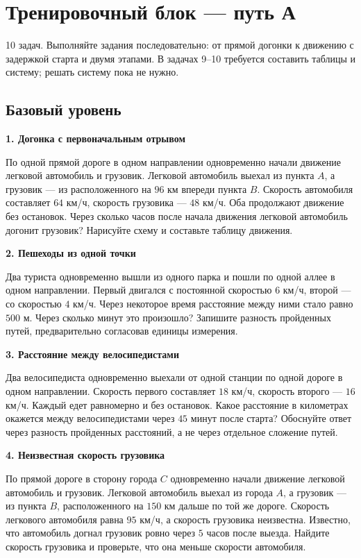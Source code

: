 \documentclass[a4paper,12pt]{article}
\newcommand{\task}[2]{\Needspace{9\baselineskip}\par\noindent\textbf{\textcolor{darkaccent}{#1.} #2}\par}
\newcommand{\smallnote}[1]{{\small\color{muted}#1}}
\begin{document}
\clearpage
\section*{Тренировочный блок --- путь А}
\smallnote{10 задач. Выполняйте задания последовательно: от прямой догонки к движению с задержкой старта и двумя этапами. В задачах 9--10 требуется составить таблицы и систему; решать систему пока не нужно.}
\vspace{3mm}

\subsection*{Базовый уровень}
\task{1}{Догонка с первоначальным отрывом}
По одной прямой дороге в одном направлении одновременно начали движение легковой автомобиль и грузовик. Легковой автомобиль выехал из пункта $A$, а грузовик --- из расположенного на $96$ км впереди пункта $B$. Скорость автомобиля составляет $64$ км/ч, скорость грузовика --- $48$ км/ч. Оба продолжают движение без остановок. Через сколько часов после начала движения легковой автомобиль догонит грузовик? Нарисуйте схему и составьте таблицу движения.

\task{2}{Пешеходы из одной точки}
Два туриста одновременно вышли из одного парка и пошли по одной аллее в одном направлении. Первый двигался с постоянной скоростью $6$ км/ч, второй --- со скоростью $4$ км/ч. Через некоторое время расстояние между ними стало равно $500$ м. Через сколько минут это произошло? Запишите разность пройденных путей, предварительно согласовав единицы измерения.

\task{3}{Расстояние между велосипедистами}
Два велосипедиста одновременно выехали от одной станции по одной дороге в одном направлении. Скорость первого составляет $18$ км/ч, скорость второго --- $16$ км/ч. Каждый едет равномерно и без остановок. Какое расстояние в километрах окажется между велосипедистами через $45$ минут после старта? Обоснуйте ответ через разность пройденных расстояний, а не через отдельное сложение путей.

\task{4}{Неизвестная скорость грузовика}
По прямой дороге в сторону города $C$ одновременно начали движение легковой автомобиль и грузовик. Легковой автомобиль выехал из города $A$, а грузовик --- из пункта $B$, расположенного на $150$ км дальше по той же дороге. Скорость легкового автомобиля равна $95$ км/ч, а скорость грузовика неизвестна. Известно, что автомобиль догнал грузовик ровно через $5$ часов после выезда. Найдите скорость грузовика и проверьте, что она меньше скорости автомобиля.
\end{document}
